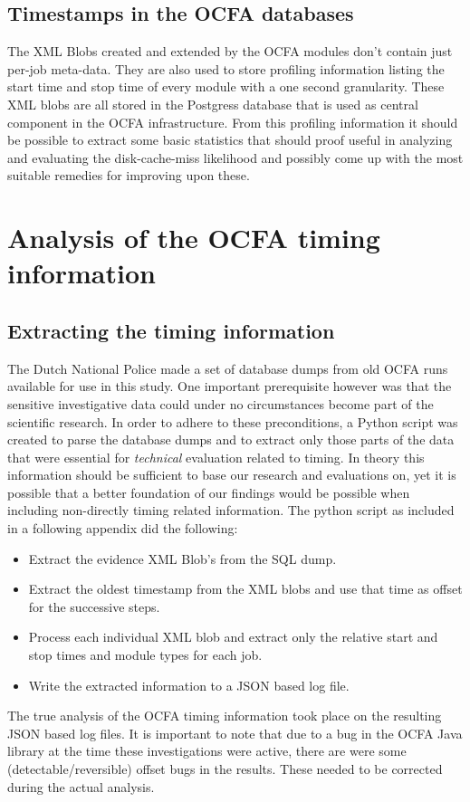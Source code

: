 \subsection{Timestamps in the OCFA databases}
The XML Blobs created and extended by the OCFA modules don't contain just per-job meta-data. They are also used to store profiling information listing the start time and stop time of every module with a one second granularity.  These XML blobs are all stored in the Postgress database that is used as central component in the OCFA infrastructure. From this profiling information it should be possible to extract some basic statistics that should proof useful in analyzing and evaluating the disk-cache-miss likelihood and possibly come up with the most suitable remedies for improving upon these.
\section{Analysis of the OCFA timing information}
\subsection{Extracting the timing information}
The Dutch National Police made a set of database dumps from old OCFA runs available for use in this study. One important prerequisite however was that the sensitive investigative data could under no circumstances become part of the scientific research. In order to adhere to these preconditions, a Python script was created to parse the database dumps and to extract only those parts of the data that were essential for \emph{technical} evaluation related to timing. In theory this information should be sufficient to base our research and evaluations on, yet it is possible that a better foundation of our findings would be possible when including non-directly timing related information. The python script as included in a following appendix did the following:
\begin{itemize}
\item Extract the evidence XML Blob's from the SQL dump.
\item Extract the oldest timestamp from the XML blobs and use that time as offset for the successive steps.
\item Process each individual XML blob and extract only the relative start and stop times and module types for each job.
\item Write the extracted information to a JSON based log file.
\end{itemize}
The true analysis of the OCFA timing information took place on the resulting JSON based log files. It is important to note that due to a bug in the OCFA Java library at the time these investigations were active, there are were some (detectable/reversible) offset bugs in the results. These needed to be corrected during the actual analysis.




